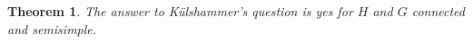 \documentclass[12pt]{amsart}
\newcommand\ra{\rightarrow}
\numberwithin{equation}{section}
\newtheorem{thm}[equation]{Theorem}
\newtheorem{lem}[equation]{Lemma}
\theoremstyle{definition}
\theoremstyle{remark}
\theoremstyle{remark}
\begin{document}
%
%
%
%

\begin{thm}
\label{thm:alg_kuls}
 The answer to K\"ulshammer's question is yes for $H$ and $G$ connected and semisimple.
\end{thm}
\end{document}
